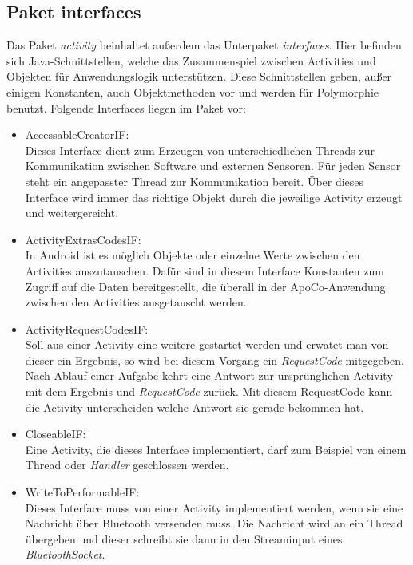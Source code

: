 \subsection*{Paket interfaces}

Das Paket \emph{activity} beinhaltet au\ss{}erdem das Unterpaket \emph{interfaces}.
Hier befinden sich Java-Schnittstellen, 
welche das Zusammenspiel zwischen Activities und Objekten f\"ur Anwendungslogik unterst\"utzen.
Diese Schnittstellen geben, au\ss{}er einigen Konstanten, auch Objektmethoden vor und werden f\"ur Polymorphie benutzt.
Folgende Interfaces liegen im Paket vor:

\begin{itemize}
 \item AccessableCreatorIF:\\
 Dieses Interface dient zum Erzeugen von unterschiedlichen Threads zur Kommunikation zwischen Software und externen Sensoren.
 F\"ur jeden Sensor steht ein angepasster Thread zur Kommunikation bereit.
 \"Uber dieses Interface wird immer das richtige Objekt durch die jeweilige Activity erzeugt und weitergereicht.

 \item ActivityExtrasCodesIF:\\
 In Android ist es m\"oglich Objekte oder einzelne Werte zwischen den Activities auszutauschen.
 Daf\"ur sind in diesem Interface Konstanten zum Zugriff auf die Daten bereitgestellt, 
 die \"uberall in der ApoCo-Anwendung zwischen den Activities ausgetauscht werden.
 
 \item ActivityRequestCodesIF:\\
 Soll aus einer Activity eine weitere gestartet werden und erwatet man von dieser ein Ergebnis, 
 so wird bei diesem Vorgang ein \emph{RequestCode} mitgegeben.
 Nach Ablauf einer Aufgabe kehrt eine Antwort zur urspr\"unglichen Activity mit dem Ergebnis und \emph{RequestCode} zur\"uck.
 Mit diesem RequestCode kann die Activity unterscheiden welche Antwort sie gerade bekommen hat.
 
 \item CloseableIF:\\
 Eine Activity, die dieses Interface implementiert, darf zum Beispiel von einem Thread oder \emph{Handler} geschlossen werden.
 \item WriteToPerformableIF:\\
 Dieses Interface muss von einer Activity implementiert werden, wenn sie eine Nachricht \"uber Bluetooth versenden muss.
 Die Nachricht wird an ein Thread \"ubergeben und dieser schreibt sie dann in den Streaminput eines \emph{BluetoothSocket}.
\end{itemize}

